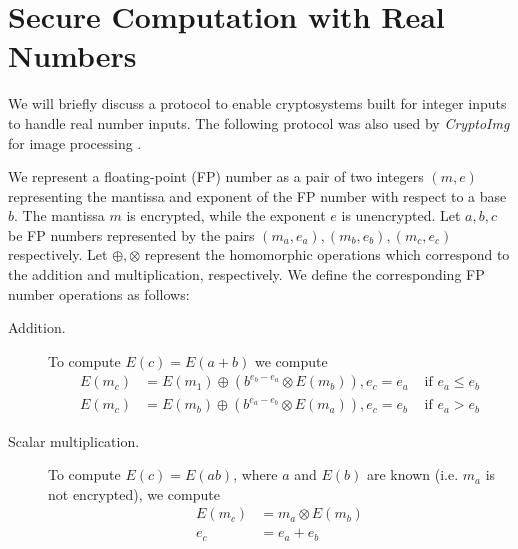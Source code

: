 \section{Secure Computation with Real Numbers}
We will briefly discuss a protocol to enable cryptosystems built for integer inputs to handle real number inputs.
The following protocol was also used by \textit{CryptoImg} for image processing \cite{ziad_cryptoimg:_2016}.

We represent a floating-point (FP) number as a pair of two integers $(m,e)$ representing the mantissa and exponent of the FP number with respect to a base $b$. The mantissa $m$ is encrypted, while the exponent $e$ is unencrypted.
Let $a,b,c$ be FP numbers represented by the pairs $(m_a,e_a),(m_b,e_b),(m_c,e_c)$ respectively. Let $\oplus,\otimes$ represent the homomorphic operations which correspond to the addition and multiplication, respectively. We define the corresponding FP number operations as follows:
\begin{description}
  \item[Addition.]
    To compute $E(c)=E(a+b)$ we compute
    \begin{align*}
      E(m_c) &= E(m_1) \oplus (b^{e_b-e_a} \otimes E(m_b)), e_c = e_a & \text{ if } e_a \leq e_b \\
      E(m_c) &= E(m_b) \oplus (b^{e_a-e_b} \otimes E(m_a)), e_c = e_b & \text{ if } e_a > e_b
    \end{align*}
  \item[Scalar multiplication.]
    To compute $E(c) = E(ab)$, where $a$ and $E(b)$ are known (i.e. $m_a$ is not encrypted), we compute
    \begin{align*}
      E(m_c) &= m_a \otimes E(m_b)\\
      e_c &= e_a + e_b
    \end{align*}
\end{description}
